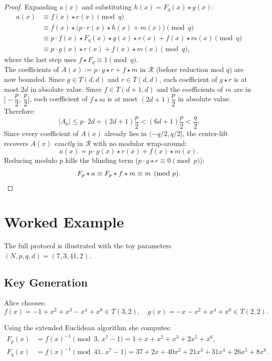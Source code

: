 \documentclass[12pt, a4paper]{article}
\theoremstyle{definition}
\theoremstyle{plain}
\newcommand{\R}{\mathcal{R}}
\begin{document}
\begin{proof}
Expanding $a(x)$ and substituting $h(x) = F_q(x) \star g(x)$:
\begin{align*}
    a(x) &\equiv f(x) \star e(x) \pmod{q} \\
         &\equiv f(x) \star \bigl(p \cdot r(x) \star h(x) + m(x)\bigr) \pmod{q} \\
         &\equiv p \cdot f(x) \star F_q(x) \star g(x) \star r(x)
              + f(x) \star m(x) \pmod{q} \\
         &\equiv p \cdot g(x) \star r(x) + f(x) \star m(x) \pmod{q},
\end{align*}
where the last step uses $f \star F_q \equiv 1 \pmod{q}$.\\

The coefficients of $A(x) := p \cdot g \star r + f \star m$ in
$\R$ (before reduction mod $q$) are now bounded. Since $g \in T(d,d)$ and $r \in T(d,d)$,
each coefficient of $g \star r$ is at most $2d$ in absolute value. Since
$f \in T(d+1,d)$ and the coefficients of $m$ are in
$\bigl[-\dfrac{p}{2},\, \dfrac{p}{2}\bigr]$, each coefficient of
$f \star m$ is at most $(2d+1)\dfrac{p}{2}$ in absolute value. Therefore:
\[
    |A_k| \le p \cdot 2d + (2d+1)\dfrac{p}{2} < (6d+1)\dfrac{p}{2} < \dfrac{q}{2}.
\]
Since every coefficient of $A(x)$ already lies in $(-q/2, q/2]$, the
center-lift recovers $A(x)$ \textit{exactly} in $\R$ with no modular wrap-around:
\[
    a(x) = p \cdot g(x) \star r(x) + f(x) \star m(x).
\]
Reducing modulo $p$ kills the blinding term ($p \cdot g \star r \equiv 0 \pmod{p}$):
\[
    F_p \star a \equiv F_p \star f \star m \equiv m \pmod{p}. \qedhere
\]
\end{proof}

\section{Worked Example}

The full protocol is illustrated with the toy parameters $(N, p, q, d) = (7, 3, 41, 2)$.

\subsection{Key Generation}

Alice chooses:
\[
    f(x) = -1 + x^2 + x^3 - x^4 + x^6 \in T(3,2), \quad
    g(x) = -x - x^2 + x^4 + x^6 \in T(2,2).
\]

Using the extended Euclidean algorithm she computes:
\begin{align*}
    F_p(x) &= f(x)^{-1} \pmod{3,\, x^7-1}
            = 1 + x + x^2 + x^3 + 2x^5 + x^6, \\
    F_q(x) &= f(x)^{-1} \pmod{41,\, x^7-1}
            = 37 + 2x + 40x^2 + 21x^3 + 31x^4 + 26x^5 + 8x^6.
\end{align*}
\end{document}
